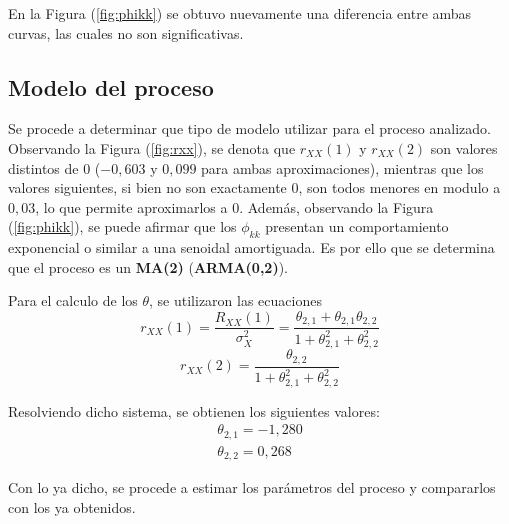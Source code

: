 En la Figura (\ref{fig:phikk}) se obtuvo nuevamente una diferencia entre ambas curvas, las cuales no son significativas.

\subsection{Modelo del proceso}

Se procede a determinar que tipo de modelo utilizar para el proceso analizado. Observando la Figura (\ref{fig:rxx}), se denota que $r_{XX}(1)$ y $r_{XX}(2)$ son valores distintos de 0 ($-0,603$ y $0,099$ para ambas aproximaciones), mientras que los valores siguientes, si bien no son exactamente 0, son todos menores en modulo a $0,03$, lo que permite aproximarlos a 0. Además, observando la Figura (\ref{fig:phikk}), se puede afirmar que los $\phi_{kk}$ presentan un comportamiento exponencial o similar a una senoidal amortiguada. Es por ello que se determina que el proceso es un \textbf{MA(2)} (\textbf{ARMA(0,2)}).

Para el calculo de los $\theta$, se utilizaron las ecuaciones
\begin{equation}
	r_{XX}(1) = \frac{R_{XX}(1)}{\sigma_X^2} = \frac{\theta_{2,1} + \theta_{2,1} \theta_{2,2}}{1 +\theta_{2,1}^2 + \theta_{2,2}^2}
\end{equation}
\begin{equation}
	r_{XX}(2) = \frac{\theta_{2,2}}{1 +\theta_{2,1}^2 + \theta_{2,2}^2}
\end{equation}

Resolviendo dicho sistema, se obtienen los siguientes valores:
\begin{equation}
\begin{gathered}
	\theta_{2,1} = -1,280	\\
	\theta_{2,2} = 0,268	
\end{gathered}
\end{equation}

Con lo ya dicho, se procede a estimar los parámetros del proceso y compararlos con los ya obtenidos.

